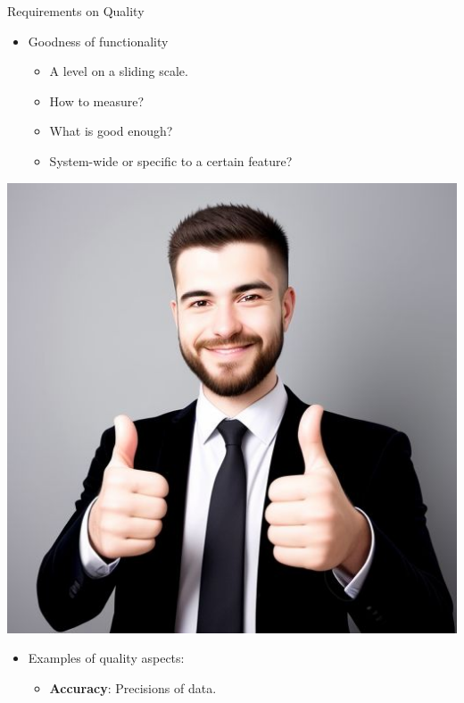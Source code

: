 \documentclass{simpleslides}
\begin{document}
\begin{frame}[fragile]{Requirements on Quality}
\begin{minipage}[t]{0.8\textwidth}
\vspace{0pt}
\begin{itemize}
\item Goodness of functionality 
\begin{itemize}
  \item A level on a sliding scale.
  \item How to measure?
  \item What is good enough?
  \item System-wide or specific to a certain feature?
\end{itemize}
\end{itemize}
\end{minipage}%
\begin{minipage}[t]{0.2\textwidth}
  \vspace{0pt}
  \hfill\includegraphics[width=1.0\textwidth]{img/thumbs-up}
  \end{minipage}%
\begin{itemize}
\item Examples of quality aspects:
\begin{itemize}
\item \textbf{Accuracy}: Precisions of data.

\end{itemize}
\end{itemize}
\end{frame}
\end{document}
